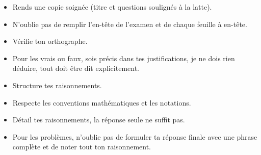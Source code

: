 \documentclass[a4paper, 12pt, parskip=half-]{scrartcl}
\begin{document}
\entete
{}
\begin{itemize}
    \item Rends une copie soignée (titre et questions soulignés à la latte).
    \item N'oublie pas de remplir l'en-tête de l'examen et de chaque feuille à en-tête.
    \item Vérifie ton orthographe.
    \item Pour les vrais ou faux, sois précis dans tes justifications, je ne dois rien déduire, tout doit être dit explicitement.
    \item Structure tes raisonnements.
    \item Respecte les conventions mathématiques et les notations.
    \item Détail tes raisonnements, la réponse seule ne suffit pas.
    \item Pour les problèmes, n'oublie pas de formuler ta réponse finale  avec une phrase complète et de noter tout ton raisonnement.
\end{itemize}
\newpage~\newpage
\end{document}

